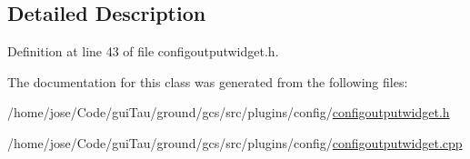 \subsection{Detailed Description}


Definition at line 43 of file configoutputwidget.\-h.



The documentation for this class was generated from the following files\-:\begin{DoxyCompactItemize}
\item 
/home/jose/\-Code/gui\-Tau/ground/gcs/src/plugins/config/\hyperlink{configoutputwidget_8h}{configoutputwidget.\-h}\item 
/home/jose/\-Code/gui\-Tau/ground/gcs/src/plugins/config/\hyperlink{configoutputwidget_8cpp}{configoutputwidget.\-cpp}\end{DoxyCompactItemize}
